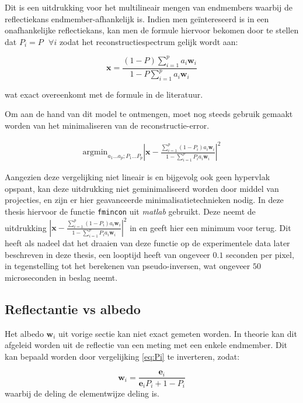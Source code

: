 \documentclass[12pt]{report}
\begin{document}
Dit is een uitdrukking voor het multilineair mengen van endmembers waarbij de reflectiekans endmember-afhankelijk is. Indien men ge\"intereseerd is in een onafhankelijke reflectiekans, kan men de formule hiervoor bekomen door te stellen dat $P_i = P \text{   }\forall i$ zodat het reconstructiespectrum gelijk wordt aan:

\begin{equation}
\bm{x} = \frac{(1-P) \sum_{i=1}^p a_{i} \bm{w}_{i}}{1-P\sum_{i=1}^p  a_{i} \bm{w}_{i}} \label{eq:P}
\end{equation}

wat exact overeenkomt met de formule in de literatuur\cite{mlinmix}.

Om aan de hand van dit model te ontmengen, moet nog steeds gebruik gemaakt worden van het minimaliseren van de reconstructie-error. 

\begin{align}
\text{argmin}_{a_1 ... a_p; P_1 ... P_p} \left| \bm{x} - \frac{\sum_{i=1}^p (1-P_i) a_{i} \bm{w}_{i}}{1-\sum_{i=1}^p P_i a_{i} \bm{w}_{i}} \right|^2
\end{align}

Aangezien deze vergelijking niet lineair is en bijgevolg ook geen hypervlak opspant, kan deze uitdrukking niet geminimaliseerd worden door middel van projecties, en zijn er hier geavanceerde minimalisatietechnieken nodig. In deze thesis hiervoor de functie \texttt{fmincon} uit \textit{matlab}\cite{matlab} gebruikt. Deze neemt de uitdrukking $\left| \bm{x} - \frac{\sum_{i=1}^p (1-P_i) a_{i} \bm{w}_{i}}{1-\sum_{i=1}^p P_i a_{i} \bm{w}_{i}} \right|^2$ in en geeft hier een minimum voor terug. Dit heeft als nadeel dat het draaien van deze functie op de experimentele data later beschreven in deze thesis, een looptijd heeft van ongeveer $0.1$ seconden per pixel, in tegenstelling tot het berekenen van pseudo-inversen, wat ongeveer $50$ microseconden in beslag neemt. 

\subsection{Reflectantie vs albedo}

Het albedo $\bm{w}_i$ uit vorige sectie kan niet exact gemeten worden. In theorie kan dit afgeleid worden uit de reflectie van een meting met een enkele endmember. Dit kan bepaald worden door vergelijking \ref{eq:Pi} te inverteren, zodat:

\begin{equation}
\bm{w}_i = \frac{\bm{e}_i}{\bm{e}_iP_i + 1 - P_i}
\end{equation}
waarbij de deling de elementwijze deling is. 
\end{document}
